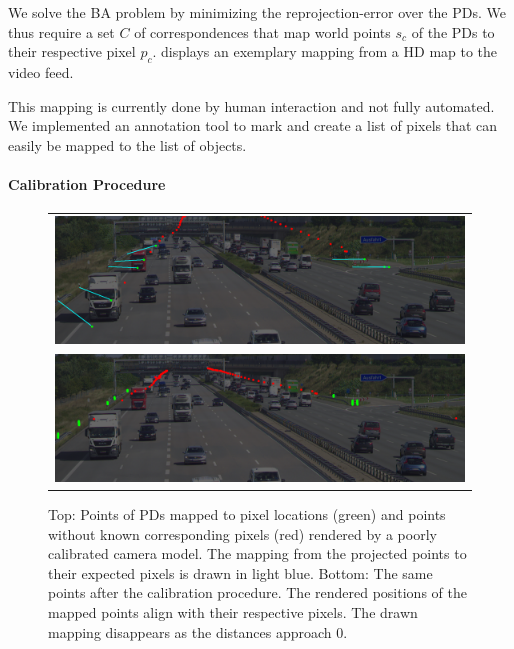 We solve the BA problem by minimizing the reprojection-error over the PDs.
We thus require a set $C$ of correspondences that map world points $s_c$ of the PDs to their respective pixel $p_c$. 
 displays an exemplary mapping from a HD map to the video feed.

This mapping is currently done by human interaction and not fully automated. 
We implemented an annotation tool to mark and create a list of pixels that can easily be mapped to the list of objects.


\paragraph{Calibration Procedure}
\begin{figure}[t]
  \centering
  \begin{tabular}{c}
    \includegraphics[width=0.95\linewidth]{images/calibration/background_uncalibrated_with_mapping.png}    \\
    \includegraphics[width=0.95\linewidth]{images/calibration/background_calibrated.png}    
  \end{tabular}
  \caption{
    Top: Points of PDs mapped to pixel locations (green) and points without known corresponding pixels (red) rendered by a poorly calibrated camera model.
    The mapping from the projected points to their expected pixels is drawn in light blue.
    Bottom: The same points after the calibration procedure.
    The rendered positions of the mapped points align with their respective pixels.
    The drawn mapping disappears as the distances approach $0$.
   }
  \label{fig:static_calibration_calibration}
\end{figure}
  
